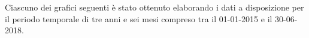 Ciascuno dei grafici seguenti è stato ottenuto elaborando i dati a disposizione per il periodo temporale di tre anni e sei mesi compreso tra il 01-01-2015 e il 30-06-2018. 